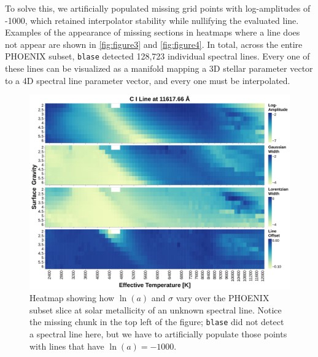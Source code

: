 \documentclass[twocolumn]{aastex631}
\begin{document}
To solve this, we artificially populated missing grid points with log-amplitudes of -1000, which retained interpolator stability while nullifying the evaluated line. 
Examples of the appearance of missing sections in heatmaps where a line does not appear are shown in \autoref{fig:figure3} and \autoref{fig:figure4}. 
In total, across the entire PHOENIX subset, \texttt{blase} detected 128,723 individual spectral lines.  
Every one of these lines can be visualized as a manifold mapping a 3D stellar parameter vector to a 4D spectral line parameter vector, and every one must be interpolated.
\begin{figure}
    \centering
    \includegraphics[width=\textwidth]{figure3}
    \caption{Heatmap showing how $\ln(a)$ and $\sigma$ vary over the PHOENIX subset slice at solar metallicity of an unknown spectral line. 
    Notice the missing chunk in the top left of the figure; \texttt{blase} did not detect a spectral line here, but we have to artificially populate those points with lines that have $\ln(a) = -1000$.}
    \label{fig:figure3}
\end{figure}
\end{document}
